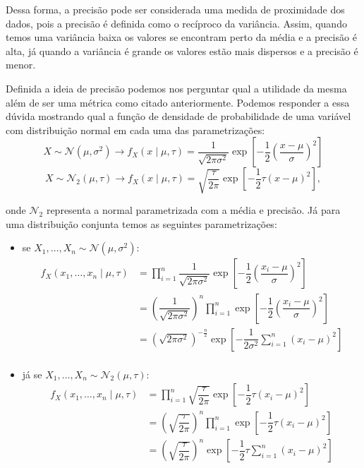\documentclass{article}
\begin{document}
Dessa forma, a precisão pode ser considerada uma medida de proximidade dos dados, pois a precisão é definida como o recíproco da variância. Assim, quando temos uma variância baixa os valores se encontram perto da média e a precisão é alta, já quando a variância é grande os valores estão mais dispersos e a precisão é menor.

Definida a ideia de precisão podemos nos perguntar qual a utilidade da mesma além de ser uma métrica como citado anteriormente. Podemos responder a essa dúvida mostrando qual a função de densidade de probabilidade de uma variável com distribuição normal em cada uma das parametrizações:
\[X \sim \mathcal{N}(\mu, \sigma^2) \longrightarrow f_X(x \mid \mu, \tau) = \dfrac{1}{\sqrt{2\pi \sigma^2}}\exp{\left[-\dfrac{1}{2}\left(\dfrac{x - \mu}{\sigma}\right)^2\right]}\]
\[X \sim \mathcal{N}_2(\mu, \tau) \longrightarrow f_X(x \mid \mu, \tau) = \sqrt{\dfrac{\tau}{2\pi}}\exp{\left[-\dfrac{1}{2}\tau(x - \mu)^2\right]},\]

\noindent onde $\mathcal{N}_2$ representa a normal parametrizada com a média e precisão. Já para uma distribuição conjunta temos as seguintes parametrizações:
\begin{itemize}
    \item
        se $X_1, \dots, X_n \sim \mathcal{N}(\mu, \sigma^2)$:
        \begin{equation*}
            \begin{split}
                f_X(x_1, \dots, x_n \mid \mu, \tau) & = \prod_{i = 1}^{n} \dfrac{1}{\sqrt{2\pi \sigma^2}}\exp{\left[-\dfrac{1}{2}\left(\dfrac{x_i - \mu}{\sigma}\right)^2\right]} \\
                & = \left(\dfrac{1}{\sqrt{2\pi \sigma^2}}\right)^n \prod_{i = 1}^{n} \exp{\left[-\dfrac{1}{2}\left(\dfrac{x_i - \mu}{\sigma}\right)^2\right]} \\
                & = \left(\sqrt{2\pi \sigma^2}\right)^{-\frac{n}{2}} \exp{\left[-\dfrac{1}{2\sigma^2}\sum_{i = 1}^{n}\left(x_i - \mu\right)^2\right]} \\
            \end{split}
        \end{equation*}
        
    \item
        já se $X_1, \dots, X_n \sim \mathcal{N}_2(\mu, \tau)$:
        \begin{equation}
            \label{eq1}
            \begin{split}
                f_X(x_1, \dots, x_n \mid \mu, \tau) & = \prod_{i = 1}^{n} \sqrt{\dfrac{\tau}{2\pi}}\exp{\left[-\dfrac{1}{2}\tau(x_i - \mu)^2\right]} \\
                & = \left(\sqrt{\dfrac{\tau}{2\pi}}\right)^n \prod_{i = 1}^{n} \exp{\left[-\dfrac{1}{2}\tau\left(x_i - \mu\right)^2\right]} \\
                & = \left(\sqrt{\dfrac{\tau}{2\pi}}\right)^n \exp{\left[-\dfrac{1}{2}\tau\sum_{i = 1}^{n}\left(x_i - \mu\right)^2\right]} \\
            \end{split}
        \end{equation}
\end{itemize}
\end{document}
